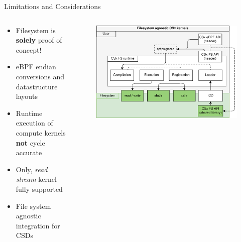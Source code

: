 \documentclass[aspectratio=169, notes]{beamer}
\begin{document}
\begin{frame}{Limitations and Considerations}
    \begin{columns}
        \begin{column}{0.50\textwidth}
            \footnotesize
            \begin{itemize}
                \item Filesystem is \textbf{solely} proof of concept!
                \item eBPF endian conversions and datastructure layouts
                \item Runtime execution of compute kernels \textbf{not}
                      cycle accurate
                \item Only, \textit{read stream} kernel fully supported
                \item File system agnostic integration for CSDs
            \end{itemize}
            \textit{}
        \end{column}
        \begin{column}{0.50\textwidth}
            \begingroup
            \small
            \begin{figure}
                \centering
                \includegraphics[width=1\textwidth]{resources/images/csx-fs-agnostic.png}
            \end{figure}
            \endgroup
        \end{column}
    \end{columns}
\end{frame}
\end{document}
